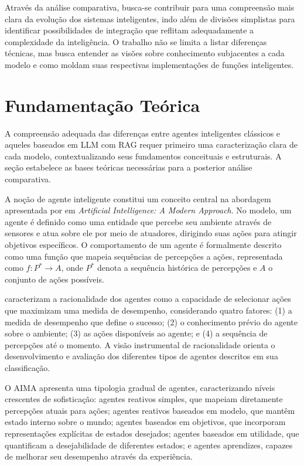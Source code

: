 \documentclass[12pt]{article}
\begin{document}
Através da análise comparativa, busca-se contribuir para uma compreensão mais clara da evolução dos sistemas inteligentes, indo além de divisões simplistas para identificar possibilidades de integração que reflitam adequadamente a complexidade da inteligência. O trabalho não se limita a listar diferenças técnicas, mas busca entender as visões sobre conhecimento subjacentes a cada modelo e como moldam suas respectivas implementações de funções inteligentes.

\section{Fundamentação Teórica}

A compreensão adequada das diferenças entre agentes inteligentes clássicos e aqueles baseados em LLM com RAG requer primeiro uma caracterização clara de cada modelo, contextualizando seus fundamentos conceituais e estruturais. A seção estabelece as bases teóricas necessárias para a posterior análise comparativa.

A noção de agente inteligente constitui um conceito central na abordagem apresentada por \citet{russell2010} em \textit{Artificial Intelligence: A Modern Approach}. No modelo, um agente é definido como uma entidade que percebe seu ambiente através de sensores e atua sobre ele por meio de atuadores, dirigindo suas ações para atingir objetivos específicos. O comportamento de um agente é formalmente descrito como uma função que mapeia sequências de percepções a ações, representada como $f: P^* \rightarrow A$, onde $P^*$ denota a sequência histórica de percepções e $A$ o conjunto de ações possíveis.

\citet{russell2010} caracterizam a racionalidade dos agentes como a capacidade de selecionar ações que maximizam uma medida de desempenho, considerando quatro fatores: (1) a medida de desempenho que define o sucesso; (2) o conhecimento prévio do agente sobre o ambiente; (3) as ações disponíveis ao agente; e (4) a sequência de percepções até o momento. A visão instrumental de racionalidade orienta o desenvolvimento e avaliação dos diferentes tipos de agentes descritos em sua classificação.

O AIMA apresenta uma tipologia gradual de agentes, caracterizando níveis crescentes de sofisticação: agentes reativos simples, que mapeiam diretamente percepções atuais para ações; agentes reativos baseados em modelo, que mantêm estado interno sobre o mundo; agentes baseados em objetivos, que incorporam representações explícitas de estados desejados; agentes baseados em utilidade, que quantificam a desejabilidade de diferentes estados; e agentes aprendizes, capazes de melhorar seu desempenho através da experiência.
\end{document}
